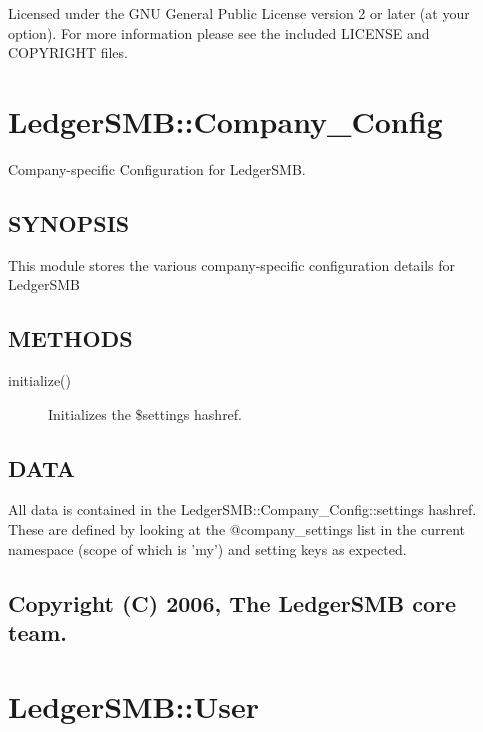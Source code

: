\begin{description}
\begin{description}
\begin{description}
\begin{description}
\begin{description}
\begin{description}
Licensed under the GNU General Public License version 2 or later (at your 
option).  For more information please see the included LICENSE and COPYRIGHT 
files.

\section{LedgerSMB::Company\_Config\label{LedgerSMB::Company_Config}}


Company-specific Configuration for LedgerSMB.

\subsection*{SYNOPSIS\label{LedgerSMB::Company_Config_SYNOPSIS}}


This module stores the various company-specific configuration details for
LedgerSMB

\subsection*{METHODS\label{LedgerSMB::Company_Config_METHODS}}
\begin{description}

\item[{initialize()}] \mbox{}

Initializes the \$settings hashref.

\end{description}
\subsection*{DATA\label{LedgerSMB::Company_Config_DATA}}


All data is contained in the LedgerSMB::Company\_Config::settings hashref.  
These are defined by looking at the @company\_settings list in the current 
namespace (scope of which is 'my') and setting keys as expected.

\subsection*{Copyright (C) 2006, The LedgerSMB core team.\label{LedgerSMB::Company_Config_Copyright_C_2006_The_LedgerSMB_core_team_}}
\section{LedgerSMB::User\label{LedgerSMB::User}}



\end{description}
\end{description}
\end{description}
\end{description}
\end{description}
\end{description}
